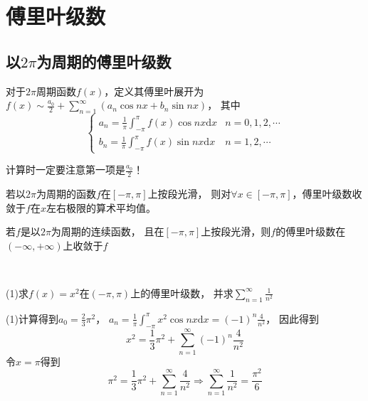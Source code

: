
\chapter{傅里叶级数}

\section{以$2\pi$为周期的傅里叶级数}

\begin{definition}[$2\pi$周期傅里叶展开]
  对于$2\pi$周期函数$f(x)$，定义其傅里叶展开为$f(x) \sim \frac{a_0}{2} + \sum\limits_{n = 1}^{\infty}(a_n \cos nx + b_n \sin nx)$，
  其中
  \begin{equation*}
    \begin{cases}
      a_n = \frac{1}{\pi} \int_{-\pi}^{\pi}f(x) \cos nx \mathrm{d}x & n = 0,1,2,\cdots\\
      b_n = \frac{1}{\pi} \int_{-\pi}^{\pi}f(x) \sin nx \mathrm{d}x & n = 1,2,\cdots
    \end{cases}
  \end{equation*}
\end{definition}

\begin{note}
  计算时一定要注意第一项是$\frac{a_0}{2}$！
\end{note}

\begin{theorem}[收敛定理]
  若以$2\pi$为周期的函数$f$在$[-\pi, \pi]$上按段光滑，
  则对$\forall x \in [-\pi,\pi]$，傅里叶级数收敛于$f$在$x$左右极限的算术平均值。
\end{theorem}

\begin{corollary}[连续特殊情况]
  若$f$是以$2\pi$为周期的连续函数，
  且在$[-\pi,\pi]$上按段光滑，则$f$的傅里叶级数在$(-\infty,+\infty)$上收敛于$f$
\end{corollary}

~

\begin{exercise}[几个经典展开]
  (1)求$f(x) = x^2$在$(-\pi, \pi)$上的傅里叶级数，
  并求$\sum\limits_{n = 1}^{\infty} \frac{1}{n^2}$
\end{exercise}

\begin{solution}
  (1)计算得到$a_0 = \frac{2}{3}\pi^2$，
  $a_n = \frac{1}{\pi} \int_{-\pi}^{\pi}x^2 \cos nx \mathrm{d} x = (-1)^n \frac{4}{n^2}$，
  因此得到
  \begin{equation*}
    x^2 = \frac{1}{3}\pi^2 + \sum\limits_{n = 1}^{\infty} (-1)^n \frac{4}{n^2}
  \end{equation*}
  令$x = \pi$得到
  \begin{equation*}
    \pi^2 = \frac{1}{3}\pi^2 + \sum\limits_{n = 1}^{\infty} \frac{4}{n^2} \Rightarrow \sum\limits_{n = 1}^{\infty} \frac{1}{n^2} = \frac{\pi^2}{6}
  \end{equation*}
\end{solution}

